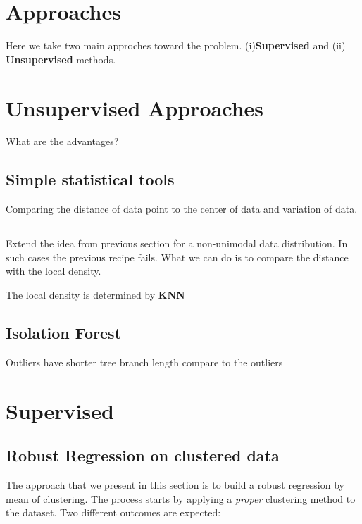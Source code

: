\documentclass{article}
\begin{document}
\section{Approaches}
Here we take two main approches toward the problem. (i){\bf Supervised} and (ii) {\bf Unsupervised} methods.


\section{Unsupervised Approaches}
What are the advantages?

\subsection{Simple statistical tools}

Comparing the distance of data point to the center of data and variation of data.

\subsection{}

Extend the idea from previous section for a non-unimodal data distribution. In such cases the previous recipe fails. What we can do is to compare the distance with the local density.

The local density is determined by {\bf KNN}

\subsection{Isolation Forest}

Outliers have shorter tree branch length compare to the outliers

\section{Supervised}

\subsection{Robust Regression on clustered data}

The approach that we present in this section is to build a robust regression by mean of clustering. The process starts by applying a {\em proper} clustering method to the dataset.  Two different outcomes are expected:
\end{document}
